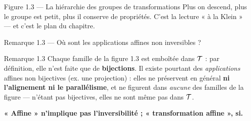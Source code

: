 \begin{frame}{Figure 1.3 --- La hiérarchie des groupes de transformations}
  \small Plus on descend, plus le groupe est petit, plus il conserve de
  propriétés. C'est la lecture « à la Klein » --- et c'est le plan du
  chapitre.
\end{frame}

\begin{frame}{Remarque 1.3 --- Où sont les applications affines non inversibles ?}
  \begin{Rem}{Remarque 1.3}
    \small Chaque famille de la figure 1.3 est emboîtée dans
    $\mathcal{T}$ : par définition, elle n'est faite que de
    \textbf{bijections}. Il existe pourtant des \emph{applications}
    affines non bijectives (ex. une projection) : elles ne préservent
    en général \textbf{ni l'alignement ni le parallélisme}, et ne
    figurent dans \emph{aucune} des familles de la figure --- n'étant
    pas bijectives, elles ne sont même pas dans $\mathcal{T}$.

    \vspace{4pt}
    \textbf{« Affine » n'implique pas l'inversibilité ; « transformation
    affine », si.}
  \end{Rem}
\end{frame}
